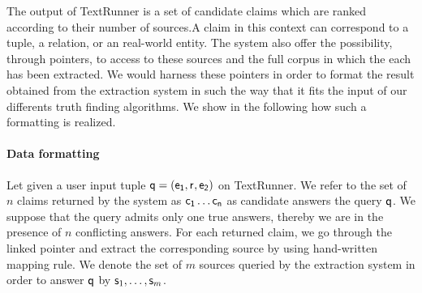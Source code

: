 The output of TextRunner is a set of candidate claims which are ranked according to their number of sources.A claim in this
context can correspond to a tuple, a relation, or an real-world entity.
The system also offer the possibility, through pointers, to access to these sources and the full corpus in which the each
has been extracted. We would harness these pointers in order to format the result obtained from the extraction system  in
such the way that it fits the input of our differents truth finding algorithms. We show in the following how such a 
formatting is realized.

\paragraph*{Data formatting}
Let given a user input tuple $\mathsf{q}=(\mathsf{e_{1}}, \mathsf{r}_{},\mathsf{e_{2}})$ on TextRunner. We refer to the set 
of $n$ claims returned by the system as $\mathsf{c_{1}}\ldots \mathsf{c_{n}}$ as candidate answers the query
$\mathsf{q}$. We suppose that the query admits only one true answers, thereby we are in the presence of
$n$ conflicting answers. For each returned claim, we go through the linked pointer and extract the
corresponding source by using hand-written mapping rule. We denote the set of $m$ sources queried by 
the extraction system in order to answer $\mathsf{q}$ by $\mathsf{s}_{1}, \ldots, \mathsf{s}_{m}$.